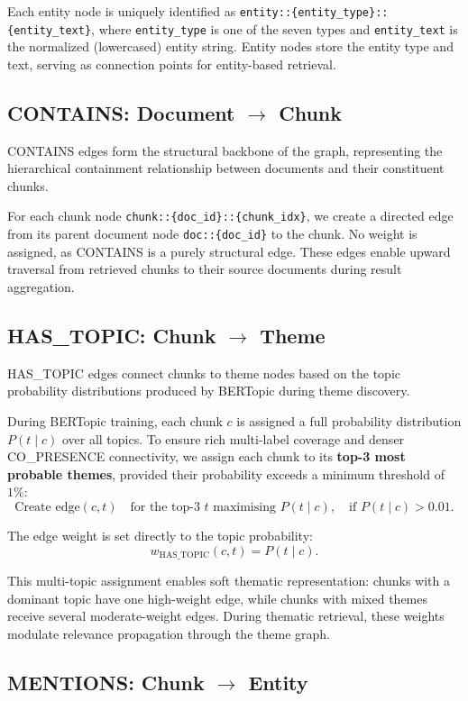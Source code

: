 \documentclass[10pt]{article}
\begin{document}
Each entity node is uniquely identified as \texttt{entity::\{entity\_type\}::\{entity\_text\}}, where \texttt{entity\_type} is one of the seven types and \texttt{entity\_text} is the normalized (lowercased) entity string. Entity nodes store the entity type and text, serving as connection points for entity-based retrieval.

\subsection{CONTAINS: Document $\to$ Chunk}

CONTAINS edges form the structural backbone of the graph, representing the hierarchical containment relationship between documents and their constituent chunks.

For each chunk node \texttt{chunk::\{doc\_id\}::\{chunk\_idx\}}, we create a directed edge from its parent document node \texttt{doc::\{doc\_id\}} to the chunk. No weight is assigned, as CONTAINS is a purely structural edge. These edges enable upward traversal from retrieved chunks to their source documents during result aggregation.

\subsection{HAS\_TOPIC: Chunk $\to$ Theme}

HAS\_TOPIC edges connect chunks to theme nodes based on the topic probability distributions produced by BERTopic during theme discovery.

During BERTopic training, each chunk $c$ is assigned a full probability distribution $P(t \mid c)$ over all topics. To ensure rich multi-label coverage and denser CO\_PRESENCE connectivity, we assign each chunk to its \textbf{top-3 most probable themes}, provided their probability exceeds a minimum threshold of $1\%$:
\[
\text{Create edge}(c, t) \quad \text{for the top-3 } t \text{ maximising } P(t \mid c), \quad \text{if } P(t \mid c) > 0.01.
\]

The edge weight is set directly to the topic probability:
\[
w_{\text{HAS\_TOPIC}}(c, t) = P(t \mid c).
\]

This multi-topic assignment enables soft thematic representation: chunks with a dominant topic have one high-weight edge, while chunks with mixed themes receive several moderate-weight edges. During thematic retrieval, these weights modulate relevance propagation through the theme graph.


\subsection{MENTIONS: Chunk $\to$ Entity}
\end{document}
